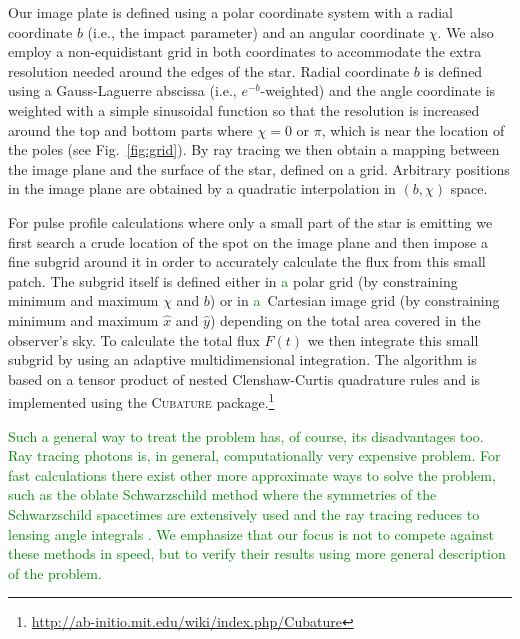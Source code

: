 \documentclass{aa}
\newcommand{\refe}[1]{\textcolor{green}{{#1}}}
\newcommand{\sch}{Schwarzschild }
\begin{document}
Our image plate is defined using a polar coordinate system with a radial
coordinate $b$ (i.e., the impact parameter) and an angular coordinate $\chi$.
We also employ a non-equidistant grid in both coordinates to accommodate
the extra resolution needed around the edges of the star.  Radial
coordinate $b$ is defined using a Gauss-Laguerre abscissa (i.e.,
$e^{-b}$-weighted) and the angle coordinate is weighted with a simple
sinusoidal function so that the resolution is increased around the top
and bottom parts where $\chi = 0$ or $\pi$, which is near the location of the poles
(see Fig.~\ref{fig:grid}).  By ray tracing we then obtain
a mapping between the image plane and the surface of the star, defined
on a grid.
Arbitrary positions in the image plane are obtained by a quadratic interpolation in $(b, \chi)$ space.

For pulse profile calculations where only a small part of the star is
emitting we first search a crude location of the spot on the image plane
and then impose a fine subgrid around it in order to accurately
calculate the flux from this small patch.  The subgrid itself is defined
either in \refe{a} polar grid (by constraining minimum and maximum $\chi$ and
$b$) or in \refe{a} Cartesian image grid (by constraining minimum and maximum
$\hat{x}$ and $\hat{y}$) depending on the total area covered in the observer's sky.  To
calculate the total flux $F(t)$ we then integrate this small subgrid by
using an adaptive multidimensional integration.  
The algorithm is based on a tensor product of nested Clenshaw-Curtis quadrature rules and is implemented using the \textsc{Cubature} package.\footnote{
\url{http://ab-initio.mit.edu/wiki/index.php/Cubature}}

\refe{
Such a general way to treat the problem has, of course, its disadvantages too.
Ray tracing photons is, in general, computationally very expensive problem.
For fast calculations there exist other more approximate ways to solve the problem, such as the oblate \sch method where the symmetries of the \sch spacetimes are extensively used and the ray tracing reduces to lensing angle integrals \citep[see e.g.][]{PB06, MLCB07}.
We emphasize that our focus is not to compete against these methods in speed, but to verify their results using more general description of the problem.
}
\end{document}
